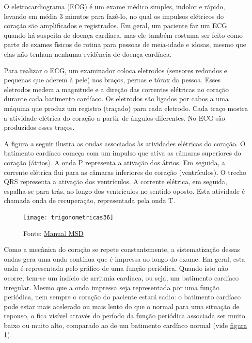 \needspace{15em}
\begin{knowledge}
\label{trig-knowledge2}


O eletrocardiograma (ECG) é um exame médico simples, indolor e rápido, levando em média 3 minutos para fazê-lo, no qual os impulsos elétricos do coração são amplificados e registrados. Em geral, um paciente faz um ECG quando há suspeita de doença cardíaca, mas ele também costuma ser feito como parte de exames físicos de rotina para pessoas de meia-idade e idosas, mesmo que elas não tenham nenhuma evidência de doença cardíaca.

Para realizar o ECG, um examinador coloca eletrodos (sensores redondos e pequenas que aderem à pele) nos braços, pernas e tórax da pessoa. Esses eletrodos medem a magnitude e a direção das correntes elétricas no coração durante cada batimento cardíaco. Os eletrodos são ligados por cabos a uma máquina que produz um registro (traçado) para cada eletrodo. Cada traço mostra a atividade elétrica do coração a partir de ângulos diferentes. No ECG são produzidos esses traços.

A figura a seguir ilustra as ondas associadas às atividades elétricas do coração. O batimento cardíaco começa com um impulso que ativa as câmaras superiores do coração (átrios). A onda P representa a ativação dos átrios. Em seguida, a corrente elétrica flui para as câmaras inferiores do coração (ventrículos). O trecho QRS representa a ativação dos ventrículos. A corrente elétrica, em seguida, espalha-se para trás, ao longo dos ventrículos no sentido oposto. Esta atividade é chamada onda de recuperação, representada pela onda T.



\begin{figure}[H]
\centering

\texttt{[image: trigonometricas36]}
\caption{Fonte: \href{https://www.msdmanuals.com/pt/casa/dist\%C3\%BArbios-do-cora\%C3\%A7\%C3\%A3o-e-dos-vasos-sangu\%C3\%ADneos/diagn\%C3\%B3stico-de-dist\%C3\%BArbios-do-cora\%C3\%A7\%C3\%A3o-e-dos-vasos-sangu\%C3\%ADneos/eletrocardiograma}{Manual MSD}}
\label{eletrocardiograma}
\end{figure}

Como a mecânica do coração se repete constantemente, a sistematização dessas ondas gera uma onda contínua que é impressa ao longo do exame. Em geral, esta onda é representada pelo gráfico de uma função periódica. Quando isto não ocorre, tem-se um indício de arritmia cardíaca, ou seja, um batimento cardíaco irregular.
Mesmo que a onda impressa seja representada por uma função periódica, nem sempre o coração do paciente estará sadio: o batimento cardíaco pode estar mais acelerado ou mais lento do que o normal para uma situação de repouso, o fica visível através do período da função periódica associada ser muito baixo ou muito alto, comparado ao de um batimento cardíaco normal (vide \hyperref[eletrocardiograma]{figura \ref{eletrocardiograma}}).


\end{knowledge}
\clearpage

